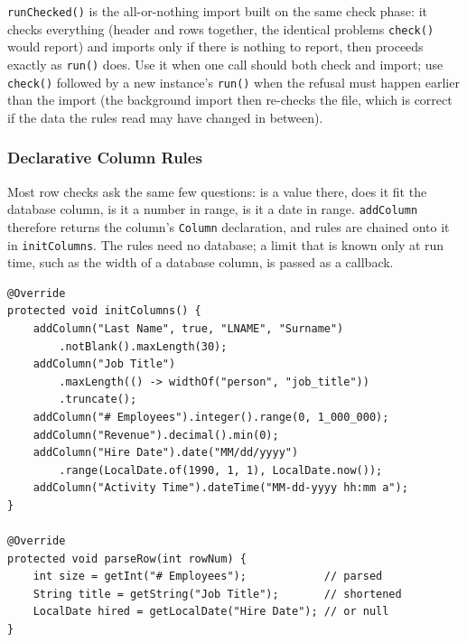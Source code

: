 \texttt{runChecked()} is the all-or-nothing import built on the same check phase: it checks everything (header and rows together, the identical problems \texttt{check()} would report) and imports only if there is nothing to report, then proceeds exactly as \texttt{run()} does.  Use it when one call should both check and import; use \texttt{check()} followed by a new instance's \texttt{run()} when the refusal must happen earlier than the import (the background import then re-checks the file, which is correct if the data the rules read may have changed in between).

\subsubsection*{Declarative Column Rules}
\label{sec:file-csv-rules}

Most row checks ask the same few questions: is a value there, does it fit the database column, is it a number in range, is it a date in range.  \texttt{addColumn} therefore returns the column's \texttt{Column} declaration, and rules are chained onto it in \texttt{initColumns}.  The rules need no database; a limit that is known only at run time, such as the width of a database column, is passed as a callback.

\begin{lstlisting}[style=java]
@Override
protected void initColumns() {
    addColumn("Last Name", true, "LNAME", "Surname")
        .notBlank().maxLength(30);
    addColumn("Job Title")
        .maxLength(() -> widthOf("person", "job_title"))
        .truncate();
    addColumn("# Employees").integer().range(0, 1_000_000);
    addColumn("Revenue").decimal().min(0);
    addColumn("Hire Date").date("MM/dd/yyyy")
        .range(LocalDate.of(1990, 1, 1), LocalDate.now());
    addColumn("Activity Time").dateTime("MM-dd-yyyy hh:mm a");
}

@Override
protected void parseRow(int rowNum) {
    int size = getInt("# Employees");            // parsed
    String title = getString("Job Title");       // shortened
    LocalDate hired = getLocalDate("Hire Date"); // or null
}
\end{lstlisting}


